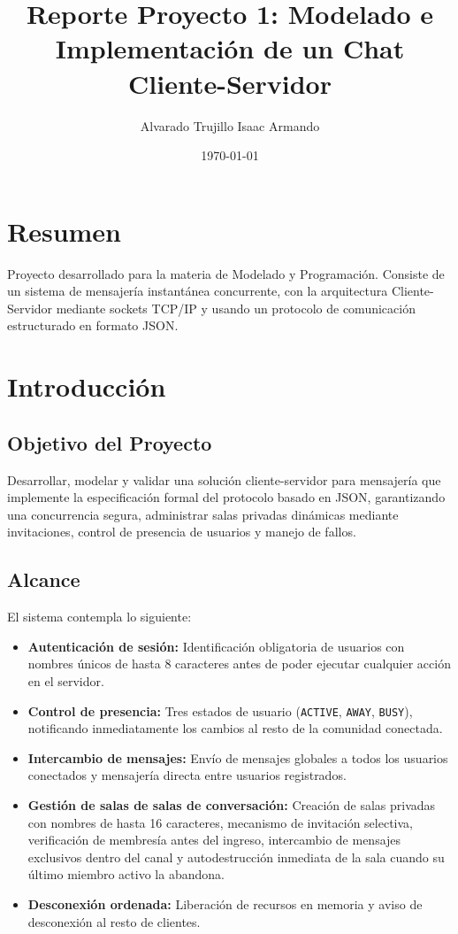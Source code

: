 \documentclass[12pt,a4paper]{article}
\title{\textbf{Reporte Proyecto 1: Modelado e Implementación de un Chat Cliente-Servidor}}
\author{Alvarado Trujillo Isaac Armando}
\date{\today}
\begin{document}
\maketitle

\section{Resumen}
 Proyecto desarrollado para la materia de Modelado y Programación. Consiste de un sistema de mensajería instantánea concurrente, con la arquitectura Cliente-Servidor mediante sockets TCP/IP y usando un protocolo de comunicación estructurado en formato JSON.

\section{Introducción}

\subsection{Objetivo del Proyecto}
Desarrollar, modelar y validar una solución cliente-servidor para mensajería que implemente la especificación formal del protocolo basado en JSON, garantizando una concurrencia segura, administrar salas privadas dinámicas mediante invitaciones, control de presencia de usuarios y manejo de fallos.

\subsection{Alcance}
El sistema contempla lo siguiente:
\begin{itemize}
    \item \textbf{Autenticación de sesión:} Identificación obligatoria de usuarios con nombres únicos de hasta 8 caracteres antes de poder ejecutar cualquier acción en el servidor.
    \item \textbf{Control de presencia:} Tres estados de usuario (\texttt{ACTIVE}, \texttt{AWAY}, \texttt{BUSY}), notificando inmediatamente los cambios al resto de la comunidad conectada.
    \item \textbf{Intercambio de mensajes:} Envío de mensajes globales a todos los usuarios conectados y mensajería directa entre usuarios registrados.
    \item \textbf{Gestión de salas de salas de conversación:} Creación de salas privadas con nombres de hasta 16 caracteres, mecanismo de invitación selectiva, verificación de membresía antes del ingreso, intercambio de mensajes exclusivos dentro del canal y autodestrucción inmediata de la sala cuando su último miembro activo la abandona.
    \item \textbf{Desconexión ordenada:} Liberación de recursos en memoria y aviso de desconexión al resto de clientes.
\end{itemize}
\end{document}

